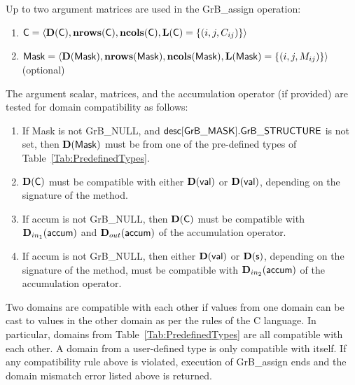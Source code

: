 Up to two argument matrices are used in the {\sf GrB\_assign} operation:
\begin{enumerate}
	\item ${\sf C} = \langle \bold{D}({\sf C}),\bold{nrows}({\sf C}),
    \bold{ncols}({\sf C}),\bold{L}({\sf C}) = \{(i,j,C_{ij}) \} \rangle$

	\item ${\sf Mask} = \langle \bold{D}({\sf Mask}),\bold{nrows}({\sf Mask}),
    \bold{ncols}({\sf Mask}),\bold{L}({\sf Mask}) = \{(i,j,M_{ij}) \} \rangle$ (optional)
\end{enumerate}

The argument scalar, matrices, and the accumulation 
operator (if provided) are tested for domain compatibility as follows:
\begin{enumerate}
	\item If {\sf Mask} is not {\sf GrB\_NULL}, and ${\sf desc[GrB\_MASK].GrB\_STRUCTURE}$
    is not set, then $\bold{D}({\sf Mask})$ must be from one of the pre-defined types of 
    Table~\ref{Tab:PredefinedTypes}.

	\item $\bold{D}({\sf C})$ must be 
    compatible with either $\bold{D}({\sf val})$ or $\bold{D}({\sf val})$, depending
	on the signature of the method.

	\item If {\sf accum} is not {\sf GrB\_NULL}, then $\bold{D}({\sf C})$ must be
    compatible with $\mbox{$\mathbf{D}_{in_{1}}$}({\sf accum})$ and $\mbox{$\mathbf{D}_{out}$}({\sf accum})$ of the accumulation operator.
	
\item If {\sf accum} is not {\sf GrB\_NULL}, then  
    either $\bold{D}({\sf val})$ or $\bold{D}({\sf s})$, depending on the signature of the method, must be compatible with $\mbox{$\mathbf{D}_{in_{2}}$}({\sf accum})$ of the accumulation operator.
\end{enumerate}
Two domains are compatible with each other if values from one domain can be cast 
to values in the other domain as per the rules of the C language.
In particular, domains from Table~\ref{Tab:PredefinedTypes} are all compatible 
with each other. A domain from a user-defined type is only compatible with itself.
If any compatibility rule above is violated, execution of {\sf GrB\_assign} ends
and the domain mismatch error listed above is returned.


